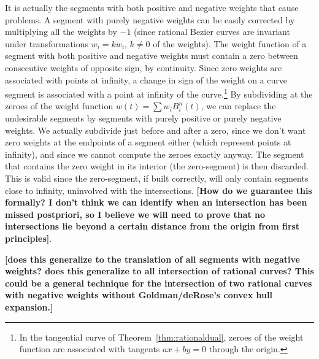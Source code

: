 \documentclass[11pt]{article}
\begin{document}
It is actually the segments with both positive
and negative weights that cause problems.
A segment with purely negative weights can be easily
corrected by multiplying all the weights by $-1$
(since rational Bezier curves are invariant under 
transformations $w_i = kw_i$, $k \neq 0$ of the weights).
The weight function of a segment with both positive and negative weights
must contain a zero between consecutive weights of opposite sign, by continuity.
Since zero weights are associated with points at infinity,
a change in sign of the weight on a curve segment 
is associated with a point at infinity of the curve.\footnote{In the 
	tangential curve of Theorem~\ref{thm:rationaldual},
	zeroes of the weight function are associated with tangents $ax+by=0$
	through the origin.}
By subdividing at the zeroes of the weight function
$w(t) = \sum w_i B_i^n(t)$,
we can replace the undesirable segments
by segments with purely positive or purely negative weights.
We actually subdivide just before and after a zero,
since we don't want zero weights at the endpoints of a segment either
(which represent points at infinity), and since we cannot
compute the zeroes exactly anyway.
The segment that contains the zero weight in its interior (the zero-segment)
is then discarded.
This is valid since the zero-segment, if built correctly,
will only contain segments close to infinity, uninvolved with the
intersections. 
{\bf [How do we guarantee this formally? I don't think
we can identify when an intersection has been missed postpriori,
so I believe we will need to prove that no intersections lie beyond
a certain distance from the origin from first principles]}.

{\bf [does this generalize to the translation of all segments with negative weights?
does this generalize to all intersection of rational curves?
This could be a general technique for the intersection of 
two rational curves with negative weights without Goldman/deRose's convex hull
expansion.]}
\end{document}
